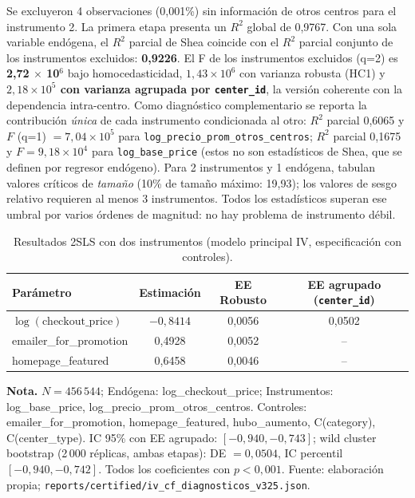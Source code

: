 \documentclass[doc, a4paper, biblatex, floatsintext, longtable, babel]{apa7}
\begin{document}
Se excluyeron 4 observaciones (0,001\%) sin información de otros centros para el instrumento 2. La primera etapa presenta un $R^2$ global de 0,9767. Con una sola variable endógena, el $R^2$ parcial de Shea coincide con el $R^2$ parcial conjunto de los instrumentos excluidos: \textbf{0,9226}. El F de los instrumentos excluidos (q=2) es \textbf{2,72 $\times$ 10$^6$} bajo homocedasticidad, $1,43 \times 10^6$ con varianza robusta (HC1) y \textbf{$2,18 \times 10^5$ con varianza agrupada por \texttt{center\_id}}, la versión coherente con la dependencia intra-centro. Como diagnóstico complementario se reporta la contribución \emph{única} de cada instrumento condicionada al otro: $R^2$ parcial 0,6065 y $F$ (q=1) $= 7,04 \times 10^5$ para \texttt{log\_precio\_prom\_otros\_centros}; $R^2$ parcial 0,1675 y $F = 9,18 \times 10^4$ para \texttt{log\_base\_price} (estos no son estadísticos de Shea, que se definen por regresor endógeno). Para 2 instrumentos y 1 endógena, \textcite{stock2005testing} tabulan valores críticos de \emph{tamaño} (10\% de tamaño máximo: 19,93); los valores de sesgo relativo requieren al menos 3 instrumentos. Todos los estadísticos superan ese umbral por varios órdenes de magnitud: no hay problema de instrumento débil.

\begin{table}[!htbp]
\centering
\caption{Resultados 2SLS con dos instrumentos (modelo principal IV, especificación con controles).}
\label{tab:iv_2sls_resultados}
\footnotesize
\begin{threeparttable}
\begin{tabular}{lccc}
\toprule
Par\'ametro & Estimaci\'on & EE Robusto & EE agrupado (\texttt{center\_id}) \\
\midrule
$\log(\text{checkout\_price})$ & \textbf{$-0,8414$} & 0,0056 & 0,0502 \\
emailer\_for\_promotion & 0,4928 & 0,0052 & -- \\
homepage\_featured & 0,6458 & 0,0046 & -- \\
\bottomrule
\end{tabular}
\begin{tablenotes}
\footnotesize
\item \textbf{Nota.} $N = 456\,544$; Endógena: log\_checkout\_price; Instrumentos: log\_base\_price, log\_precio\_prom\_otros\_centros. Controles: emailer\_for\_promotion, homepage\_featured, hubo\_aumento, C(category), C(center\_type). IC 95\% con EE agrupado: $[-0,940, -0,743]$; wild cluster bootstrap (2\,000 réplicas, ambas etapas): DE $=0,0504$, IC percentil $[-0,940, -0,742]$. Todos los coeficientes con $p<0,001$. Fuente: elaboración propia; \texttt{reports/certified/iv\_cf\_diagnosticos\_v325.json}.
\end{tablenotes}
\end{threeparttable}
\end{table}
\end{document}
